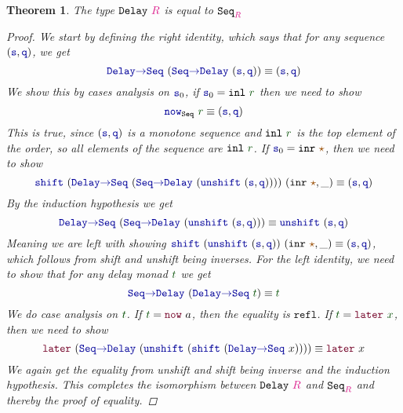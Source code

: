 \documentclass[twoside,11pt,openright]{report}
\theoremstyle{plain} %
\newtheorem{thm}{Theorem}[section]
\theoremstyle{definition}
\theoremstyle{remark}
\newcommand*{\term}[1]{\textcolor{green!30!black}{#1}} %
\newcommand*{\type}[1]{\textcolor{magenta!90!black}{#1}}
\newcommand*{\constant}[1]{\textcolor{orange!60!black}{\ensuremath{\mathtt{#1}}}}
\newcommand*{\function}[1]{\textcolor{blue!60!black}{\ensuremath{\mathtt{#1}}}}
\newcommand*{\constructor}[1]{\textcolor{purple!60!black}{\ensuremath{\mathtt{#1}}}}
\newcommand*{\typeformer}[1]{\ensuremath{\mathtt{#1}}}
\newcommand*{\unitelem}{\constant{\star}} %
\begin{document}
\begin{thm}
  \label{thm:seq-eq-delay}
  The type \(\typeformer{Delay}~\type{R}\) is equal to \(\typeformer{Seq}_{\type{R}}\)
  \begin{proof}  
    We start by defining the right identity, which says that for any sequence \((\function{s},\function{q})\), we get
    \begin{equation}
      \function{Delay{\rightarrow}Seq}~(\function{Seq{\rightarrow}Delay}~(\function{s},\function{q})) \equiv (\function{s},\function{q})
    \end{equation}
    We show this by cases analysis on \(\function{s}_0\), if \(\function{s}_0 = \mathtt{inl}~\term{r}\) then we need to show
    \begin{equation}
      \function{now}_{\typeformer{Seq}}~\term{r} \equiv (\function{s},\function{q})
    \end{equation}
    This is true, since \((\function{s},\function{q})\) is a monotone sequence and \(\mathtt{inl}~\term{r}\) is the top element of the order, so all elements of the sequence are \(\mathtt{inl}~\term{r}\). If \(\function{s}_0 = \mathtt{inr}~\unitelem\), then we need to show
    \begin{equation}
      \function{shift}~(\function{Delay{\rightarrow}Seq}~(\function{Seq{\rightarrow}Delay}~(\function{unshift}~(\function{s},\function{q}))))~(\mathtt{inr}~\unitelem,\_) \equiv (\function{s},\function{q})
    \end{equation}
    By the induction hypothesis we get
    \begin{equation}
      \function{Delay{\rightarrow}Seq}~(\function{Seq{\rightarrow}Delay}~(\function{unshift}~(\function{s},\function{q}))) \equiv \function{unshift}~(\function{s},\function{q})
    \end{equation}
    Meaning we are left with showing \(\function{shift}~(\function{unshift}~(\function{s},\function{q}))~(\texttt{inr}~\unitelem,\_) \equiv (\function{s},\function{q})\), which follows from shift and unshift being inverses. For the left identity, we need to show that for any delay monad \(\term{t}\) we get
    \begin{equation}
      \function{Seq{\rightarrow}Delay}~(\function{Delay{\rightarrow}Seq}~\term{t}) \equiv \term{t}
    \end{equation}
    We do case analysis on \(\term{t}\). If \(\term{t} = \constructor{now}~a\), then the equality is \(\mathtt{refl}\). If \(\term{t} = \constructor{later}~\term{x}\), then we need to show
    \begin{equation}
      \constructor{later}~(\function{Seq{\rightarrow}Delay}~(\function{unshift}~(\function{shift}~(\function{Delay{\rightarrow}Seq}~x)))) \equiv \constructor{later}~x
    \end{equation}
    We again get the equality from unshift and shift being inverse and the induction hypothesis. This completes the isomorphism between \(\typeformer{Delay}~\type{R}\) and \(\typeformer{Seq}_{\type{R}}\) and thereby the proof of equality.
  \end{proof}
\end{thm}
\end{document}
